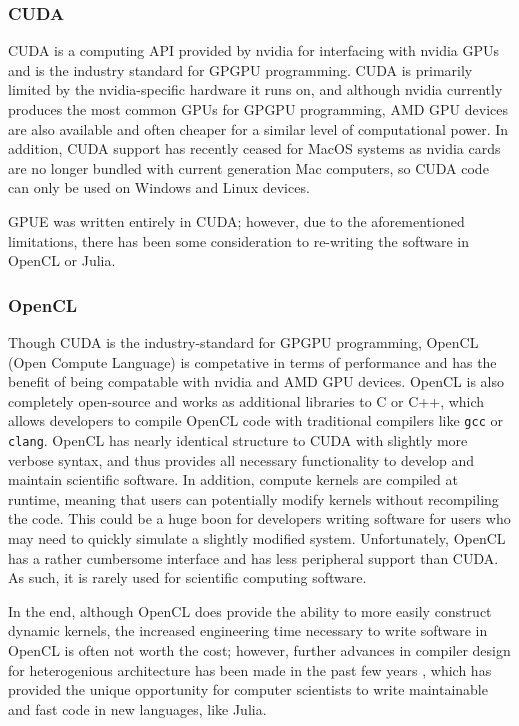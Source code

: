 \subsubsection{CUDA}
CUDA is a computing API provided by nvidia for interfacing with nvidia GPUs and is the industry standard for GPGPU programming.
CUDA is primarily limited by the nvidia-specific hardware it runs on, and although nvidia currently produces the most common GPUs for GPGPU programming, AMD GPU devices are also available and often cheaper for a similar level of computational power.
In addition, CUDA support has recently ceased for MacOS systems as nvidia cards are no longer bundled with current generation Mac computers, so CUDA code can only be used on Windows and Linux devices.

GPUE was written entirely in CUDA; however, due to the aforementioned limitations, there has been some consideration to re-writing the software in OpenCL or Julia.

\subsubsection{OpenCL}

Though CUDA is the industry-standard for GPGPU programming, OpenCL (Open Compute Language) is competative in terms of performance and has the benefit of being compatable with nvidia and AMD GPU devices.
OpenCL is also completely open-source and works as additional libraries to C or C++, which allows developers to compile OpenCL code with traditional compilers like \texttt{gcc} or \texttt{clang}.
OpenCL has nearly identical structure to CUDA with slightly more verbose syntax, and thus provides all necessary functionality to develop and maintain scientific software.
In addition, compute kernels are compiled at runtime, meaning that users can potentially modify kernels without recompiling the code.
This could be a huge boon for developers writing software for users who may need to quickly simulate a slightly modified system.
Unfortunately, OpenCL has a rather cumbersome interface and has less peripheral support than CUDA.
As such, it is rarely used for scientific computing software.

In the end, although OpenCL does provide the ability to more easily construct dynamic kernels, the increased engineering time necessary to write software in OpenCL is often not worth the cost; however, further advances in compiler design for heterogenious architecture has been made in the past few years \cite{besard2019}, which has provided the unique opportunity for computer scientists to write maintainable and fast code in new languages, like Julia.

